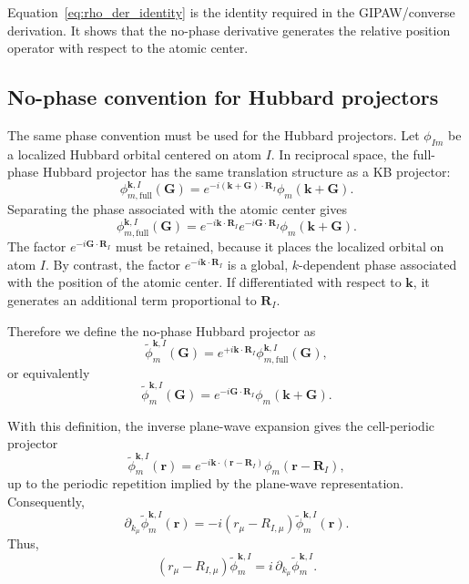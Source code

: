 \documentclass[11pt]{article}
\begin{document}
Equation~\eqref{eq:rho_der_identity} is the identity required in the
GIPAW/converse derivation. It shows that the no-phase derivative
generates the relative position operator with respect to the atomic
center.

\subsection{No-phase convention for Hubbard projectors}
\label{app:hubbard_no_phase}

The same phase convention must be used for the Hubbard projectors. Let
$\phi_{Im}$ be a localized Hubbard orbital centered on atom $I$. In
reciprocal space, the full-phase Hubbard projector has the same
translation structure as a KB projector:
\begin{equation}
\phi^{\mathbf k,I}_{m,\mathrm{full}}(\mathbf G)
=
e^{-i(\mathbf k+\mathbf G)\cdot\mathbf R_I}
\phi_m(\mathbf k+\mathbf G).
\end{equation}
Separating the phase associated with the atomic center gives
\begin{equation}
\phi^{\mathbf k,I}_{m,\mathrm{full}}(\mathbf G)
=
e^{-i\mathbf k\cdot\mathbf R_I}
e^{-i\mathbf G\cdot\mathbf R_I}
\phi_m(\mathbf k+\mathbf G).
\end{equation}
The factor $e^{-i\mathbf G\cdot\mathbf R_I}$ must be retained, because
it places the localized orbital on atom $I$. By contrast, the factor
$e^{-i\mathbf k\cdot\mathbf R_I}$ is a global, $k$-dependent phase
associated with the position of the atomic center. If differentiated
with respect to $\mathbf k$, it generates an additional term
proportional to $\mathbf R_I$.

Therefore we define the no-phase Hubbard projector as
\begin{equation}
\widetilde{\phi}^{\mathbf k,I}_{m}(\mathbf G)
=
e^{+i\mathbf k\cdot\mathbf R_I}
\phi^{\mathbf k,I}_{m,\mathrm{full}}(\mathbf G),
\end{equation}
or equivalently
\begin{equation}
\widetilde{\phi}^{\mathbf k,I}_{m}(\mathbf G)
=
e^{-i\mathbf G\cdot\mathbf R_I}
\phi_m(\mathbf k+\mathbf G).
\end{equation}

With this definition, the inverse plane-wave expansion gives the
cell-periodic projector
\begin{equation}
\widetilde{\phi}^{\mathbf k,I}_{m}(\mathbf r)
=
e^{-i\mathbf k\cdot(\mathbf r-\mathbf R_I)}
\phi_m(\mathbf r-\mathbf R_I),
\end{equation}
up to the periodic repetition implied by the plane-wave representation.
Consequently,
\begin{equation}
\partial_{k_\mu}
\widetilde{\phi}^{\mathbf k,I}_{m}(\mathbf r)
=
-i(r_\mu-R_{I,\mu})
\widetilde{\phi}^{\mathbf k,I}_{m}(\mathbf r).
\end{equation}
Thus,
\begin{equation}
(r_\mu-R_{I,\mu})
\widetilde{\phi}^{\mathbf k,I}_{m}
=
i\,\partial_{k_\mu}
\widetilde{\phi}^{\mathbf k,I}_{m}.
\end{equation}
\end{document}
